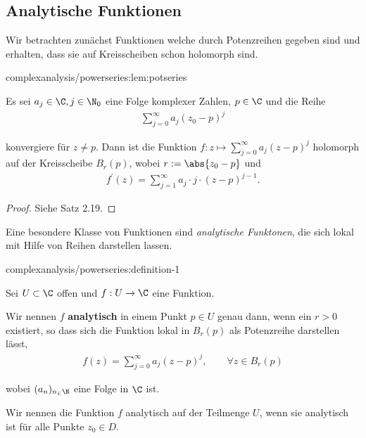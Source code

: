 \documentclass[letterpaper,10pt,german]{jupyterBook}
\begin{document}
\subsection{Analytische Funktionen}
\label{\detokenize{complexanalysis/powerseries:analytische-funktionen}}
\par
Wir betrachten zunächst Funktionen welche durch Potenzreihen gegeben sind und erhalten, dass sie auf Kreisscheiben schon holomorph sind.
\begin{lemma}{}{complexanalysis/powerseries:lem:potseries}



\par
Es sei \(a_j\in\C, j\in\N_0\) eine Folge komplexer Zahlen, \(p\in\C\) und die Reihe
\begin{align*}
\sum_{j=0}^\infty a_j (z_0-p)^j\end{align*}
\par
konvergiere für \(z\neq p\). Dann ist die Funktion \(f:z\mapsto \sum_{j=0}^\infty a_j (z-p)^j\) holomorph auf der Kreisscheibe \(B_r(p)\), wobei \(r:=\abs{z_0-p}\) und
\begin{align*}
f^\prime(z) = \sum_{j=1}^\infty a_j\cdot j\cdot (z-p)^{j-1}.
\end{align*}\end{lemma}

\begin{proof}
 Siehe \cite{Nee17} Satz 2.19.
\end{proof}

\par
Eine besondere Klasse von Funktionen sind \emph{analytische Funktonen}, die sich lokal mit Hilfe von Reihen darstellen lassen.
\begin{definition}{}{complexanalysis/powerseries:definition-1}



\par
Sei \(U \subset \C\) offen und \(f: U\to \C\) eine Funktion.

\par
Wir nennen \(f\) \textbf{analytisch} in einem Punkt \(p \in U\) genau dann, wenn ein \(r > 0\) existiert, so dass sich die Funktion lokal in \(B_r(p)\) als Potenzreihe darstellen lässt,
\begin{align*}
f(z) = \sum_{j=0}^\infty a_j (z-p)^j, \qquad \forall z\in B_r(p)
\end{align*}
\par
wobei \((a_n)_{n_\in\N}\) eine Folge in \(\C\) ist.

\par
Wir nennen die Funktion \(f\) analytisch auf der Teilmenge \(U\), wenn sie analytisch ist für alle Punkte \(z_0 \in D\).
\end{definition}
\end{document}
